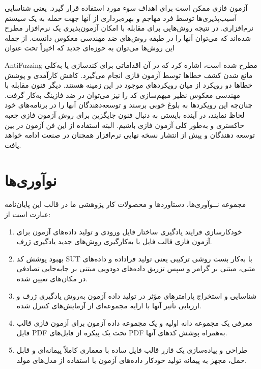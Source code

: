 آزمون فازی ممکن است برای اهداف سوء مورد استفاده قرار گیرد. یعنی شناسایی آسیب‌پذیری‌ها توسط فرد مهاجم و بهره‌برداری از آنها جهت حمله به یک سیستم نرم‌افزاری. در نتیجه روش‌هایی برای مقابله با امکان آزمون‌پذیری یک نرم‌افزار مطرح شده‌اند که می‌توان آنها را در طبقه روش‌های ضد مهندسی معکوس دانست. از جمله این روش‌ها می‌توان به حوزه‌ای جدید که اخیراً  تحت عنوان 
{\gls{AntiFuzzing}
مطرح شده است، اشاره کرد که در آن اقداماتی برای کندسازی یا به‌کلی مانع شدن کشف خطاها توسط آزمون فازی انجام می‌گیرد. کاهش کارآمدی و پوشش خطاها دو رویکرد از میان رویکردهای موجود در این زمینه هستند. دیگر فنون مقابله با مهندسی معکوس نظیر مبهم‌سازی کد را نیز می‌توان در ضد فازینگ به‌کار گرفت. 
چنان‌چه این رویکردها به بلوغ خوبی برسند و توسعه‌دهندگان آنها را در برنامه‌های خود لحاظ نمایند، در آینده بایستی به دنبال فنون جایگزین برای روش‌ آزمون فازی جعبه خاکستری و به‌طور کلی آزمون‌ فازی باشیم. البته استفاده از این فن آزمون در بین توسعه دهندگان و پیش از انتشار نسخه نهایی نرم‌افزار همچنان در صنعت ادامه خواهد یافت.




\section{نوآوری‌ها}
مجموعه نــوآوری‌ها، دستاوردها و محصولات کار پژوهشی ما در قالب این پایان‌نامه عبارت است از:
\begin{enumerate}
	\item{
		خودکارسازی فرایند یادگیری ساختار فایل ورودی و تولید داده‌های آزمون برای آزمون فازی قالب فایل با به‌کارگیری روش‌های جدید یادگیری ژرف. 
	}
	
	\item{
		بهبود پوشش کد \gls{SUT} با به‌کار بست روشی ترکیبی یعنی تولید فراداده و داده‌های متنی، مبتنی بر گرامر و سپس تزریق داده‌های دودویی مبتنی بر جابه‌جایی تصادفی در مکان‌های تعیین شده.
	}
	\item{
		شناسایی و استخراج پارامترهای مؤثر در تولید داده آزمون به‌روش یادگیری ژرف و ارزیابی تأثیر آنها با ارایه مجموعه‌ای از آزمایش‌های کنترل شده.
		
	}
	\item{
		معرفی یک مجموعه دانه اولیه و یک مجموعه داده آزمون برای آزمون فازی  قالب فایل \gls{PDF} تحت یک پیکره از فایل‌های \gls{PDF} به‌همراه پوشش کد‌های آنها.
		
	}
	
	\item{
		طراحی و پیاده‌سازی یک فازر قالب فایل ساده با معماری کاملاً پیمانه‌ای و قابل حمل، مجهز به پیمانه تولید خودکار داده‌های آزمون با استفاده از مدل‌های مولد.	
	}
	

\end{enumerate}}
